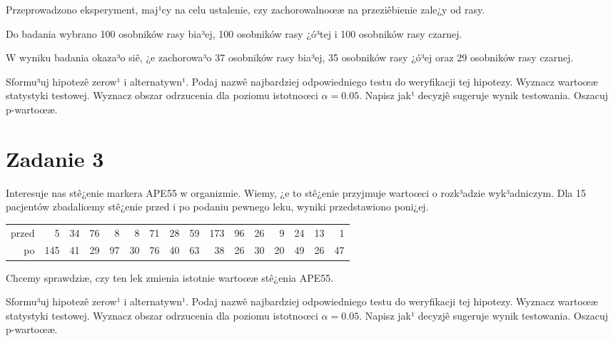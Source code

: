 \documentclass[a4paper,12pt]{article}
\begin{document}
  Przeprowadzono eksperyment, maj¹cy na celu ustalenie, czy zachorowalnoœæ na przeziêbienie zale¿y od rasy.
  
  Do badania wybrano 100 osobników rasy bia³ej, 100 osobników rasy ¿ó³tej i 100 osobników rasy czarnej. 
  
  W wyniku badania okaza³o siê, ¿e zachorowa³o 37 osobników rasy bia³ej, 35 osobników rasy ¿ó³ej oraz 29 osobników rasy czarnej. 
  
  Sformu³uj hipotezê zerow¹ i alternatywn¹. 
  Podaj nazwê najbardziej odpowiedniego testu do weryfikacji tej hipotezy. 
  Wyznacz wartoœæ statystyki testowej. 
  Wyznacz obszar odrzucenia dla poziomu istotnoœci $\alpha=0.05$. 
  Napisz jak¹ decyzjê sugeruje wynik testowania. Oszacuj p-wartoœæ. \vspace{1cm} 

  \section*{Zadanie 3}
     
  Interesuje nas stê¿enie markera APE55  w organizmie. 
  Wiemy, ¿e to stê¿enie przyjmuje wartoœci o rozk³adzie wyk³adniczym. 
  Dla 15 pacjentów zbadaliœmy stê¿enie przed i po podaniu pewnego leku, 
  wyniki przedstawiono poni¿ej.
  
  \vspace{0.5cm} 
  \noindent\begin{center} 
\begin{tabular}{rrrrrrrrrrrrrrrr}
  \hline
  \hline
przed & 5 & 34 & 76 & 8 & 8 & 71 & 28 & 59 & 173 & 96 & 26 & 9 & 24 & 13 & 1 \\
  po & 145 & 41 & 29 & 97 & 30 & 76 & 40 & 63 & 38 & 26 & 30 & 20 & 49 & 26 & 47 \\
   \hline
\end{tabular}
 
  \end{center} 
  \vspace{0.5cm}
  
  Chcemy sprawdziæ, czy ten lek zmienia istotnie wartoœæ stê¿enia APE55.
  
  Sformu³uj hipotezê zerow¹ i alternatywn¹. 
  Podaj nazwê najbardziej odpowiedniego testu do weryfikacji tej hipotezy. 
  Wyznacz wartoœæ statystyki testowej. 
  Wyznacz obszar odrzucenia dla poziomu istotnoœci $\alpha=0.05$. 
  Napisz jak¹ decyzjê sugeruje wynik testowania. Oszacuj p-wartoœæ. \vspace{1cm} 
\end{document}
